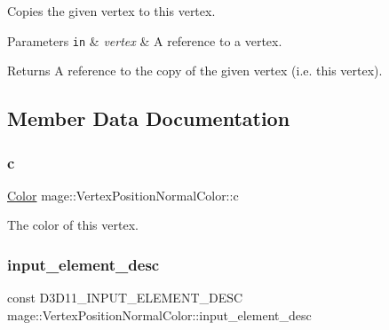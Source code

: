 Copies the given vertex to this vertex.


\begin{DoxyParams}[1]{Parameters}
\mbox{\tt in}  & {\em vertex} & A reference to a vertex. \\
\hline
\end{DoxyParams}
\begin{DoxyReturn}{Returns}
A reference to the copy of the given vertex (i.\+e. this vertex). 
\end{DoxyReturn}


\subsection{Member Data Documentation}
\hypertarget{structmage_1_1_vertex_position_normal_color_a0d170b26a78b179330ae282ce97a036b}{}\label{structmage_1_1_vertex_position_normal_color_a0d170b26a78b179330ae282ce97a036b} 
\subsubsection{\texorpdfstring{c}{c}}
{\footnotesize\ttfamily \hyperlink{structmage_1_1_color}{Color} mage\+::\+Vertex\+Position\+Normal\+Color\+::c}

The color of this vertex. \hypertarget{structmage_1_1_vertex_position_normal_color_a6ed09568c20b3a839c875dd173280f48}{}\label{structmage_1_1_vertex_position_normal_color_a6ed09568c20b3a839c875dd173280f48} 
\subsubsection{\texorpdfstring{input\+\_\+element\+\_\+desc}{input\_element\_desc}}
{\footnotesize\ttfamily const D3\+D11\+\_\+\+I\+N\+P\+U\+T\+\_\+\+E\+L\+E\+M\+E\+N\+T\+\_\+\+D\+E\+SC mage\+::\+Vertex\+Position\+Normal\+Color\+::input\+\_\+element\+\_\+desc\hspace{0.3cm}{\ttfamily [static]}}

